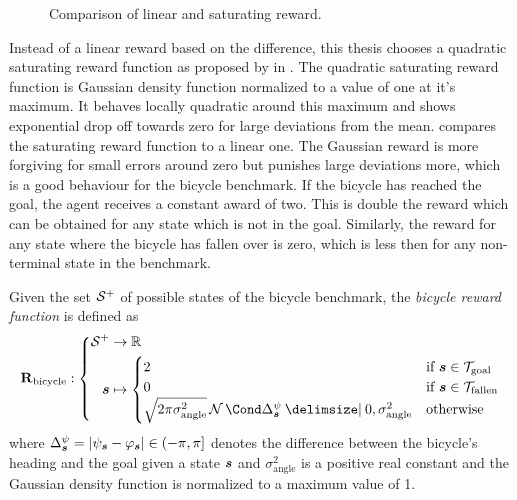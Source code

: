 \begin{figure}[t]
    \centering
    \caption{Comparison of linear and saturating reward.}
    \label{fig:saturating_reward}
\end{figure}
Instead of a linear reward based on the difference, this thesis chooses a quadratic saturating reward function as proposed by \citeauthor*{deisenroth_gaussian_2015} in \cite{deisenroth_gaussian_2015}.
The quadratic saturating reward function is Gaussian density function normalized to a value of one at it's maximum.
It behaves locally quadratic around this maximum and shows exponential drop off towards zero for large deviations from the mean.
 compares the saturating reward function to a linear one.
The Gaussian reward is more forgiving for small errors around zero but punishes large deviations more, which is a good behaviour for the bicycle benchmark.
If the bicycle has reached the goal, the agent receives a constant award of two.
This is double the reward which can be obtained for any state which is not in the goal.
Similarly, the reward for any state where the bicycle has fallen over is zero, which is less then for any non-terminal state in the benchmark.

\begin{definition}
    Given the set $\mathcal{S}^+$ of possible states of the bicycle benchmark, the \emph{bicycle reward function} is defined as
    \begin{align}
        \RwdBicycle : \left\{
            \begin{aligned}
                \Es^+ &\to \R \\
                \mat{s} &\mapsto \begin{cases}
                    2 & \text{if $\mat{s} \in \Goal$} \\
                    0 & \text{if $\mat{s} \in \Fallen$} \\
                \sqrt{2\pi\sigma_{\text{angle}}^2}\Gaussian{\Delta^\psi_{\mat{s}} \given 0, \sigma_{\text{angle}}^2} & \text{otherwise}
                \end{cases}
            \end{aligned}
        \right.
    \end{align}
    where $\Delta^\psi_{\mat{s}} = \abs{\psi_{\mat{s}} - \varphi_{\mat{s}}} \in (-\pi, \pi]$ denotes the difference between the bicycle's heading and the goal given a state $\bm{s}$ and $\sigma_{\text{angle}}^2$ is a positive real constant and the Gaussian density function is normalized to a maximum value of 1.
\end{definition}

